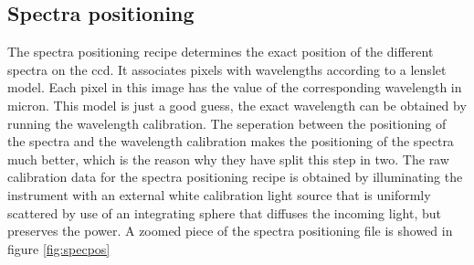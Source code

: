 \documentclass[twoside,single]{lion-msc}
\begin{document}
\subsection{Spectra positioning}
The spectra positioning recipe determines the exact position of the different spectra on the ccd. It associates pixels with wavelengths according to a lenslet model. Each pixel in this image has the value of the corresponding wavelength in micron. This model is just a good guess, the exact wavelength can be obtained by running the wavelength calibration. The seperation between the positioning of the spectra and the wavelength calibration makes the positioning of the spectra much better, which is the reason why they have split this step in two. The raw calibration data for the spectra positioning recipe is obtained by illuminating the instrument with an external white calibration light source that is uniformly scattered by use of an integrating sphere that diffuses the incoming light, but preserves the power. A zoomed piece of the spectra positioning file is showed in figure \ref{fig:specpos}
\end{document}
